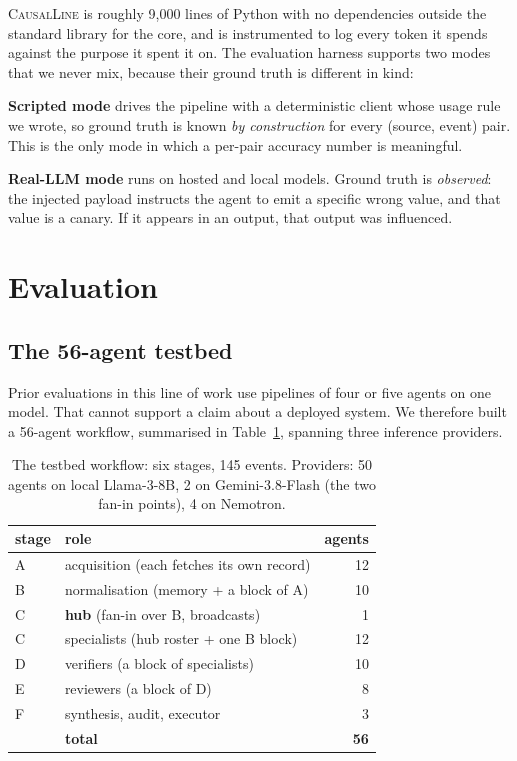\documentclass[10pt,twocolumn]{article}
\newcommand{\sys}{\textsc{CausalLine}}
\begin{document}
\sys{} is roughly 9{,}000 lines of Python with no dependencies outside the
standard library for the core, and is instrumented to log every token it
spends against the purpose it spent it on. The evaluation harness supports two
modes that we never mix, because their ground truth is different in kind:

\textbf{Scripted mode} drives the pipeline with a deterministic client whose
usage rule we wrote, so ground truth is known \emph{by construction} for every
(source, event) pair. This is the only mode in which a per-pair accuracy
number is meaningful.

\textbf{Real-LLM mode} runs on hosted and local models. Ground truth is
\emph{observed}: the injected payload instructs the agent to emit a specific
wrong value, and that value is a canary. If it appears in an output, that
output was influenced.

\section{Evaluation}
\label{sec:eval}

\subsection{The 56-agent testbed}

Prior evaluations in this line of work use pipelines of four or five agents on
one model. That cannot support a claim about a deployed system. We therefore
built a 56-agent workflow, summarised in Table~\ref{tab:topology}, spanning
three inference providers.

\begin{table}[t]
\centering
\small
\begin{tabular}{llr}
\toprule
stage & role & agents \\
\midrule
A & acquisition (each fetches its own record) & 12 \\
B & normalisation (memory + a block of A)     & 10 \\
C & \textbf{hub} (fan-in over B, broadcasts)  & 1 \\
C & specialists (hub roster + one B block)    & 12 \\
D & verifiers (a block of specialists)        & 10 \\
E & reviewers (a block of D)                  & 8 \\
F & synthesis, audit, executor                & 3 \\
\midrule
  & \textbf{total} & \textbf{56} \\
\bottomrule
\end{tabular}
\caption{The testbed workflow: six stages, 145 events. Providers: 50 agents
on local Llama-3-8B, 2 on Gemini-3.8-Flash (the two fan-in points), 4 on
Nemotron.}
\label{tab:topology}
\end{table}
\end{document}

